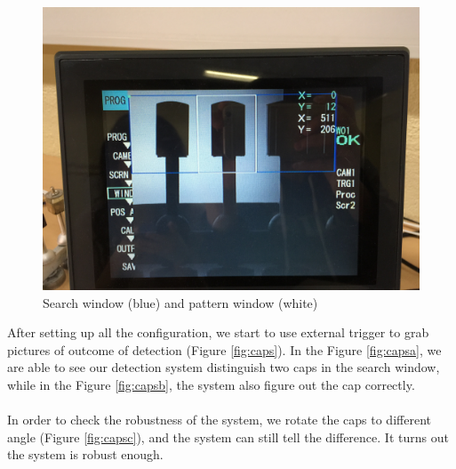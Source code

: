 \documentclass[english]{article}
\begin{document}
\begin{figure}[H]
	\centering
	\includegraphics[width=0.6\linewidth]{Pictures/IMG_1225.JPG}
	\caption{Search window (blue) and pattern window (white)}
	\label{fig:window}
\end{figure} 

After setting up all the configuration, we start to use external trigger to grab pictures of outcome of detection (Figure \ref{fig:caps}). In the Figure \ref{fig:capsa}, we are able to see our detection system distinguish two caps in the search window, while in the Figure \ref{fig:capsb}, the system also figure out the cap correctly.\\
\\
In order to check the robustness of the system, we rotate the caps to different angle (Figure \ref{fig:capsc}), and the system can still tell the difference. It turns out the system is robust enough.
\end{document}
